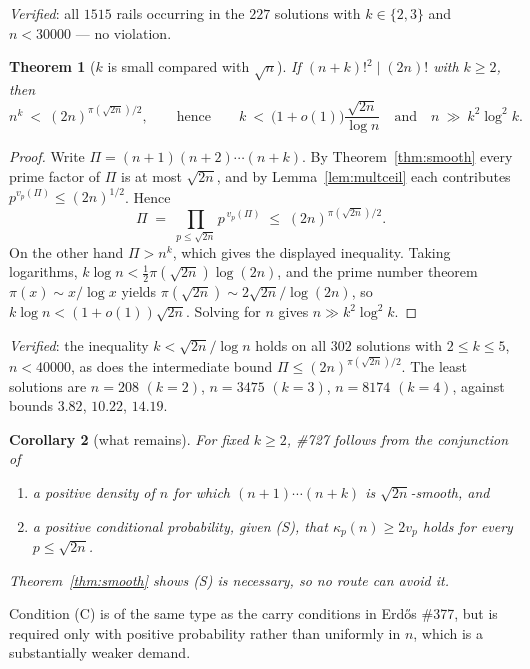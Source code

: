 \documentclass[11pt]{article}
\newtheorem{theorem}{Theorem}
\newtheorem{corollary}[theorem]{Corollary}
\begin{document}
\emph{Verified}: all $1515$ rails occurring in the $227$ solutions with $k\in\{2,3\}$ and
$n<30000$ --- no violation.

\begin{theorem}[$k$ is small compared with $\sqrt n$]\label{thm:kbound}
If $(n+k)!^{2}\mid(2n)!$ with $k\ge2$, then
\[
  n^{k}\ <\ (2n)^{\pi(\sqrt{2n})/2},
  \qquad\text{hence}\qquad
  k\ <\ \bigl(1+o(1)\bigr)\frac{\sqrt{2n}}{\log n}
  \quad\text{and}\quad n\ \gg\ k^{2}\log^{2}k .
\]
\end{theorem}

\begin{proof}
Write $\Pi=(n{+}1)(n{+}2)\cdots(n{+}k)$.  By Theorem~\ref{thm:smooth} every prime factor of
$\Pi$ is at most $\sqrt{2n}$, and by Lemma~\ref{lem:multceil} each contributes
$p^{v_p(\Pi)}\le(2n)^{1/2}$.  Hence
\[
  \Pi\;=\;\prod_{p\le\sqrt{2n}}p^{\,v_p(\Pi)}\;\le\;(2n)^{\pi(\sqrt{2n})/2}.
\]
On the other hand $\Pi>n^{k}$, which gives the displayed inequality.  Taking logarithms,
$k\log n<\tfrac12\pi(\sqrt{2n})\log(2n)$, and the prime number theorem
$\pi(x)\sim x/\log x$ yields $\pi(\sqrt{2n})\sim 2\sqrt{2n}/\log(2n)$, so
$k\log n<(1+o(1))\sqrt{2n}$.  Solving for $n$ gives $n\gg k^{2}\log^{2}k$.
\end{proof}

\emph{Verified}: the inequality $k<\sqrt{2n}/\log n$ holds on all $302$ solutions with
$2\le k\le5$, $n<40000$, as does the intermediate bound
$\Pi\le(2n)^{\pi(\sqrt{2n})/2}$.  The least solutions are $n=208$ $(k=2)$, $n=3475$
$(k=3)$, $n=8174$ $(k=4)$, against bounds $3.82$, $10.22$, $14.19$.

\begin{corollary}[what remains]\label{cor:727route}
For fixed $k\ge2$, \#727 follows from the conjunction of
\begin{enumerate}
\item[(S)] a positive density of $n$ for which $(n{+}1)\cdots(n{+}k)$ is $\sqrt{2n}$-smooth,
and
\item[(C)] a positive conditional probability, given \textup{(S)}, that
$\kappa_p(n)\ge2v_p$ holds for every $p\le\sqrt{2n}$.
\end{enumerate}
Theorem~\ref{thm:smooth} shows \textup{(S)} is \emph{necessary}, so no route can avoid it.
\end{corollary}

Condition (C) is of the same type as the carry conditions in Erd\H{o}s \#377, but is
required only with positive probability rather than uniformly in $n$, which is a
substantially weaker demand.
\end{document}
